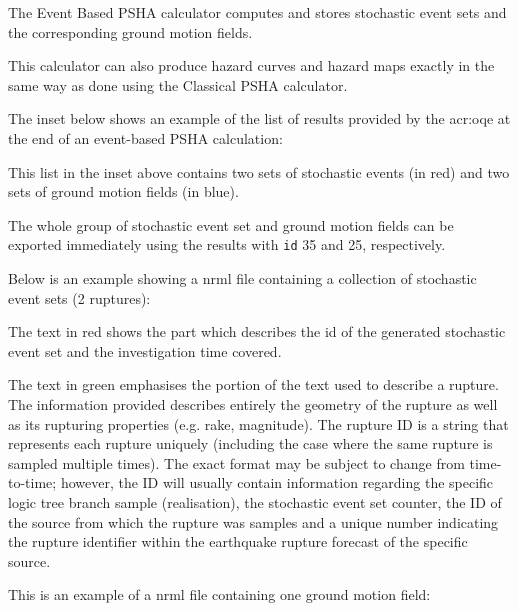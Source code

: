 The Event Based PSHA calculator computes and stores stochastic event sets and
the corresponding ground motion fields.

This calculator can also produce hazard curves and hazard maps exactly in the
same way as done using the Classical PSHA calculator.

The inset below shows an example of the list of results provided by the
\gls{acr:oqe} at the end of an event-based PSHA calculation:



This list in the inset above contains two sets of stochastic events (in red)
and two sets of ground motion fields (in blue).

The whole group of stochastic event set and ground motion fields can be
exported immediately using the results with \texttt{id} 35 and 25, respectively.

Below is an example showing a nrml file containing a collection of stochastic
event sets (2 ruptures):



The text in red shows the part which describes the id of the generated
stochastic event set and the investigation time covered.

The text in green emphasises the portion of the text used to describe a
rupture. The information provided describes entirely the geometry of the rupture as well as its rupturing properties (e.g. rake, magnitude). The rupture ID is a string that represents each rupture uniquely (including the case where the same rupture is sampled multiple times). The exact format may be subject to change from time-to-time; however, the ID will usually contain information regarding the specific logic tree branch sample (realisation), the stochastic event set counter, the ID of the source from which the rupture was samples and a unique number indicating the rupture identifier within the earthquake rupture forecast of the specific source.

This is an example of a nrml file containing one ground motion field:


